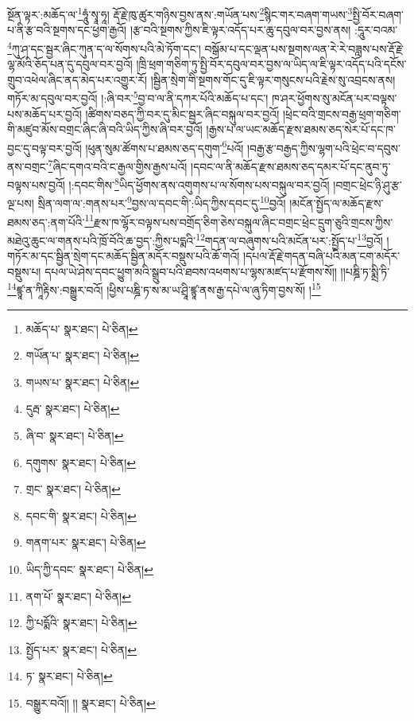 སྔོན་ལྟར་:མཆོད་ལ་\footnote{མཆོད་པ་  སྣར་ཐང་།  པེ་ཅིན། }ཧཱུཾ་སྭཱ་ཧཱ། རྡོ་རྗེ་ཁུ་ཚུར་གཉིས་བྱས་ནས་:གཡོན་པས་\footnote{གཡོན་པ་  སྣར་ཐང་།  པེ་ཅིན། }སྙིང་གར་བཞག་གཡས་\footnote{གཡས་པ་  སྣར་ཐང་།  པེ་ཅིན། }སྤྱི་བོར་བཞག་པ་ནི་རྩ་བའི་སྔགས་དང་ཕྱག་རྒྱའོ། །རྩ་བའི་སྔགས་ཀྱིས་ཇི་ལྟར་འདོད་པར་ཆུ་དབུལ་བར་བྱས་ནས། :དཱུར་བའམ་\footnote{དུརྦ་  སྣར་ཐང་།  པེ་ཅིན། }ཀུ་ཤ་དང་སྦྱར་ཞིང་ཀུན་ད་ལ་སོགས་པའི་མེ་ཏོག་དང་། བསྒོམ་པ་དང་ལྡན་པས་སྔགས་ལན་རེ་རེ་བཟླས་པས་རྡོ་རྗེ་ལྷ་མོའི་ཅོད་པན་དུ་དབུལ་བར་བྱའོ། །ཁྲི་ཕྲག་གཅིག་ཏུ་སྤྱི་བོར་དབུལ་བར་བྱས་ལ་ཡིད་ལ་ཇི་ལྟར་འདོད་པའི་དངོས་གྲུབ་འཕེལ་ཞིང་ནད་མེད་པར་འགྱུར་རོ། །སྦྱིན་སྲེག་གི་སྔགས་གོང་དུ་ཇི་ལྟར་གསུངས་པའི་རྗེས་སུ་འབྲངས་ནས། གཏོར་མ་དབུལ་བར་བྱའོ། །:ཞི་བར་\footnote{ཞི་བ་  སྣར་ཐང་།  པེ་ཅིན། }བྱ་བ་ལ་ནི་དཀར་པོའི་མཆོད་པ་དང་། ཁ་ཤར་ཕྱོགས་སུ་མངོན་པར་བལྟས་པས་མཆོད་པར་བྱའོ། །ཚིགས་བཅད་ཀྱི་བར་དུ་མིང་སྦྱར་ཞིང་བསྐུལ་བར་བྱའོ། །ཕྲེང་བའི་གྲངས་བརྒྱ་ཕྲག་གཅིག་གི་མཛུབ་མོས་བགྲང་ཞིང་ཞི་བའི་ཡིད་ཀྱིས་ཞི་བར་བྱའོ། །རྒྱས་པ་ལ་ཡང་མཆོད་རྫས་ཐམས་ཅད་སེར་པོ་དང་ཁ་བྱང་དུ་བལྟ་བར་བྱའོ། །ཕུན་སུམ་ཚོགས་པ་ཐམས་ཅད་དགུག་\footnote{དགུགས་  སྣར་ཐང་།  པེ་ཅིན། }པའོ། །བརྒྱ་རྩ་བརྒྱད་ཀྱིས་ལྷག་པའི་ཕྲེང་བ་དབུས་ནས་བགྲང་\footnote{གྲང་  སྣར་ཐང་།  པེ་ཅིན། }ཞིང་དགའ་བའི་ང་རྒྱལ་གྱིས་རྒྱས་པའོ། །དབང་ལ་ནི་མཆོད་རྫས་ཐམས་ཅད་དམར་པོ་དང་ནུབ་ཏུ་བལྟས་པས་བྱའོ། །:དབང་གིས་\footnote{དབང་གི་  སྣར་ཐང་།  པེ་ཅིན། }ཡིད་ཕྱོགས་ནས་འགུགས་པ་ལ་སོགས་པས་བསྐུལ་བར་བྱའོ། །བགྲང་ཕྲེང་ཉི་ཤུ་རྩ་ལྔ་པས། སྲིན་ལག་ལ་:གནས་པར་\footnote{གནག་པར་  སྣར་ཐང་།  པེ་ཅིན། }བྱས་ལ་དབང་གི་:ཡིད་ཀྱིས་དབང་དུ་\footnote{ཡིད་ཀྱི་དབང་  སྣར་ཐང་།  པེ་ཅིན། }བྱའོ། །མངོན་སྤྱོད་ལ་མཆོད་རྫས་ཐམས་ཅད་:ནག་པོའི་\footnote{ནག་པོ་  སྣར་ཐང་།  པེ་ཅིན། }རྫས་ཁ་ལྷོར་བལྟས་པས་བགྲོད་ཅིག་ཅེས་བསྐུལ་ཞིང་བགྲང་ཕྲེང་དྲུག་ཅུའི་གྲངས་ཀྱིས་མཐེའུ་ཆུང་ལ་གནས་པའི་ཁྲོ་བོའི་ཆ་བྱད་:ཀྱིས་པདྨའི་\footnote{ཀྱི་པདྨོའི་  སྣར་ཐང་།  པེ་ཅིན། }གདན་ལ་བཞུགས་པའི་མངོན་པར་:སྤྱོད་པ་\footnote{སྤྱོད་པར་  སྣར་ཐང་།  པེ་ཅིན། }བྱའོ། །གཏོར་མ་དང་སྦྱིན་སྲེག་དང་མཆོད་སྦྱིན་མདོར་བསྡུས་པའི་ཆོ་གའོ། །དཔལ་རྡོ་རྗེ་གདན་བཞི་པའི་མན་ངག་མདོར་བསྡུས་པ། དཔལ་ཡེ་ཤེས་དབང་ཕྱུག་མའི་སྒྲུབ་པའི་ཐབས་འཕགས་པ་ལྷས་མཛད་པ་རྫོགས་སོ།། །།པཎྜི་ཏ་སྨྲི་ཏི་\footnote{ཏ་  སྣར་ཐང་།  པེ་ཅིན། }ཛྙཱ་ན་ཀཱིརྟིས་:བསྒྱུར་བའོ། །ཕྱིས་པཎྜི་ཏ་ས་མ་ཡ་ཤྲཱི་ཛྙཱ་ནས་རྒྱ་དཔེ་ལ་ཞུ་ཏིག་བྱས་སོ། །\footnote{བསྒྱུར་བའོ།། །།  སྣར་ཐང་།  པེ་ཅིན། }